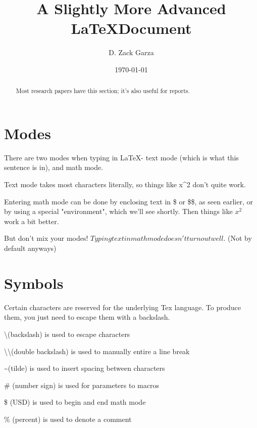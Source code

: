 \documentclass{article}
\author{D. Zack Garza}
\title{A Slightly More Advanced \LaTeX Document}
\date{\today}
\begin{document}
\maketitle
\newpage
\tableofcontents
\newpage



\begin{abstract}
    Most research papers have this section; it's also useful for reports.
\end{abstract}


\section{Modes}
    There are two modes when typing in \LaTeX - text mode (which is what this sentence is in), and math mode.

    Text mode takes most characters literally, so things like x^2 don't quite work.

    Entering math mode can be done by enclosing text in \$ or \$\$, as seen earlier, or by using a special "environment", which we'll see shortly. Then things like $x^2$ work a bit better.

    But don't mix your modes! $Typing text in math mode doesn't turn out well.$ (Not by default anyways)


\section{Symbols}
    Certain characters are reserved for the underlying Tex language. To produce them, you just need to escape them with a backslash.

    \textbackslash (backslash) is used to escape characters

    \textbackslash\textbackslash (double backslash) is used to manually entire a line break

    \textasciitilde (tilde) is used to insert spacing between characters

    \# (number sign) is used for parameters to macros

    \$ (USD) is used to begin and end math mode

    \% (percent) is used to denote a comment
\end{document}
